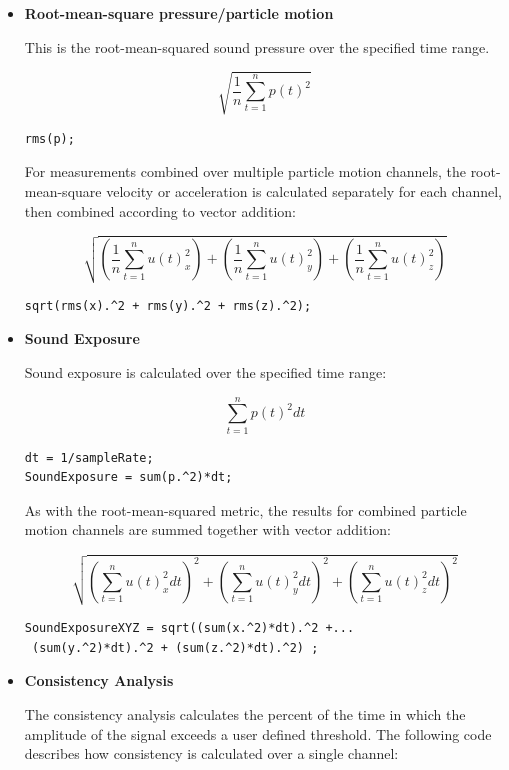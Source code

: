 \documentclass[11pt]{report}
\begin{document}
\begin{itemize}
\item \textbf{Root-mean-square pressure/particle motion}

This is the root-mean-squared sound pressure over the specified time range.

$$ \sqrt{\frac{1}{n} \sum_{t  =1}^{n}p(t)^2} $$

\begin{lstlisting}
rms(p);
\end{lstlisting}

For measurements combined over multiple particle motion channels, the root-mean-square velocity or acceleration is calculated separately for each channel, then combined according to vector addition:

$$\sqrt{\left(\frac{1}{n} \sum_{t = 1}^{n}u(t)^2_x \right) + \left(\frac{1}{n} \sum_{t = 1}^{n}u(t)_y^2 \right) + \left(\frac{1}{n} \sum_{t = 1}^{n}u(t)^2_z \right)}$$

\begin{lstlisting}
sqrt(rms(x).^2 + rms(y).^2 + rms(z).^2);
\end{lstlisting}

\item \textbf{Sound Exposure}

Sound exposure is calculated over the specified time range:

$$ \sum_{t = 1}^{n}p(t)^2 dt $$

\begin{lstlisting}
dt = 1/sampleRate;
SoundExposure = sum(p.^2)*dt;
\end{lstlisting}

As with the root-mean-squared metric, the results for combined particle motion channels are summed together with vector addition:

$$ \sqrt{\left(\sum_{t = 1}^{n}u(t)_x^2 dt \right)^2 + \left(\sum_{t = 1}^{n}u(t)^2_y dt \right)^2 + \left( \sum_{t = 1}^{n}u(t)^2_z dt \right)^2 }$$

\begin{lstlisting}
SoundExposureXYZ = sqrt((sum(x.^2)*dt).^2 +...
 (sum(y.^2)*dt).^2 + (sum(z.^2)*dt).^2) ;
\end{lstlisting}

\item \textbf{Consistency Analysis}

The consistency analysis calculates the percent of the time in which the amplitude of the signal exceeds a user defined threshold.  The following code describes how consistency is calculated over a single channel:


\end{itemize}
\end{document}
